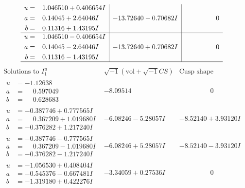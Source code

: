 \documentclass[1p]{elsarticle_modified}
\theoremstyle{definition}
\newcommand{\I}{\sqrt{-1}}
\begin{document}
$$\begin{array}{c|c|c}
\begin{aligned}
u &= \phantom{-}1.046510 + 0.406654 I \\
a &= \phantom{-}0.14045 + 2.64046 I \\
b &= \phantom{-}0.11316 + 1.43195 I\end{aligned}
 & -13.72640 - 0.70682 I & \phantom{-0.000000 } 0 \\ \hline\begin{aligned}
u &= \phantom{-}1.046510 - 0.406654 I \\
a &= \phantom{-}0.14045 - 2.64046 I \\
b &= \phantom{-}0.11316 - 1.43195 I\end{aligned}
 & -13.72640 + 0.70682 I & \phantom{-0.000000 } 0\\
 \hline 
 \end{array}$$\newpage$$\begin{array}{c|c|c}  
\text{Solutions to }I^u_{1}& \I (\text{vol} + \sqrt{-1}CS) & \text{Cusp shape}\\
 \hline 
\begin{aligned}
u &= -1.12638\phantom{ +0.000000I} \\
a &= \phantom{-}0.597049\phantom{ +0.000000I} \\
b &= \phantom{-}0.628683\phantom{ +0.000000I}\end{aligned}
 & -8.09514\phantom{ +0.000000I} & \phantom{-0.000000 } 0 \\ \hline\begin{aligned}
u &= -0.387746 + 0.777565 I \\
a &= \phantom{-}0.367209 + 1.019680 I \\
b &= -0.376282 + 1.217240 I\end{aligned}
 & -6.08246 - 5.28057 I & -8.52140 + 3.93120 I \\ \hline\begin{aligned}
u &= -0.387746 - 0.777565 I \\
a &= \phantom{-}0.367209 - 1.019680 I \\
b &= -0.376282 - 1.217240 I\end{aligned}
 & -6.08246 + 5.28057 I & -8.52140 - 3.93120 I \\ \hline\begin{aligned}
u &= -1.056530 + 0.408404 I \\
a &= -0.545376 - 0.667481 I \\
b &= -1.319180 + 0.422276 I\end{aligned}
 & -3.34059 + 0.27536 I & \phantom{-0.000000 } 0 \\ \hline\begin{aligned}

\end{aligned}
\end{array}$$
\end{document}
